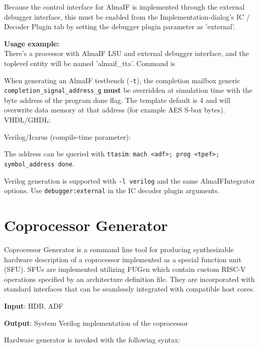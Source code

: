 \documentclass[a4paper,twoside]{tceusermanual}
\begin{document}
Because the control interface for AlmaIF is implemented through the external
debugger interface, this must be enabled from the Implementation-dialog's
IC / Decoder Plugin tab by setting the debugger plugin parameter as 'external'.

\textbf{Usage example:} \\
There's a processor with AlmaIF LSU and external debugger interface, and the
toplevel entity will be named 'almaif\_tta'. Command is


When generating an AlmaIF testbench (\texttt{-t}), the completion mailbox
generic \texttt{completion\_signal\_address\_g} \textbf{must} be overridden
at simulation time with the byte address of the program done flag. The
template default is 4 and will overwrite data memory at that address (for
example AES S-box bytes). VHDL/GHDL:


Verilog/Icarus (compile-time parameter):


The address can be queried with \texttt{ttasim}:
\texttt{mach <adf>; prog <tpef>; symbol\_address done}.

Verilog generation is supported with \texttt{-l verilog} and the same
AlmaIFIntegrator options. Use \texttt{debugger:external} in the IC decoder
plugin arguments.


\section{Coprocessor Generator}
\label{sec:gencopro}
Coprocessor Generator is a command line tool for producing synthesizable hardware 
description of a coprocessor implemented as a special function unit (SFU). SFUs are 
implemented utilizing FUGen which contain custom RISC-V operations specified by 
an architecture definition file. They are incorporated with standard interfaces 
that can be seamlessly integrated with compatible host cores.

\textbf{Input}: HDB, ADF

\textbf{Output}: System Verilog implementation of the coprocessor

Hardware generator is invoked with the following syntax:
\end{document}
